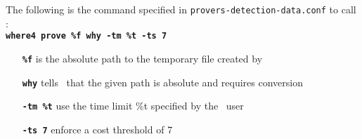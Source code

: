 The following is the command specified in \texttt{provers-detection-data.conf} to call \where:\\

\noindent \texttt{\textbf{where4 prove \%f \textendash\textendash why -tm \%t -ts 7}}

\begin{itemize}
	\item[\texttt{\textbf{\%f}}] is the absolute path to the temporary file created by \why
	\item[\texttt{\textbf{\textendash\textendash why}}] tells \where~that the given path is absolute and requires conversion
	\item[\texttt{\textbf{-tm \%t}}] use the time limit \%t specified by the \why~user
	\item[\texttt{\textbf{-ts 7}}] enforce a cost threshold of 7
\end{itemize}


